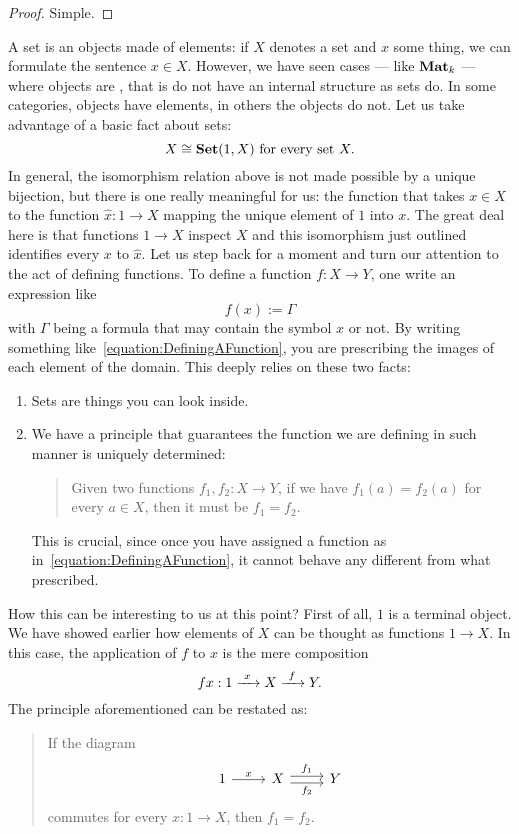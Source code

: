 \begin{proof}
Simple.
\end{proof}

\begin{example}
A set is an objects made of elements: if \(X\) denotes a set and \(x\) some thing, we can formulate the sentence \(x \in X\). However, we have seen cases --- like \(\mathbf{Mat}_k\) --- where objects are , that is do not have an internal structure as sets do. In some categories, objects have elements, in others the objects do not.\newline
Let us take advantage of a basic fact about sets:
\[X \cong \mathbf{Set}(1, X) \text{ for every set } X .\]
In general, the isomorphism relation above is not made possible by a unique bijection, but there is one really meaningful for us: the function that takes \(x \in X\) to the function \(\hat x : 1 \to X\) mapping the unique element of \(1\) into \(x\). The great deal here is that functions \(1 \to X\) inspect \(X\) and this isomorphism just outlined identifies every \(x\) to \(\hat x\).\newline
Let us step back for a moment and turn our attention to the act of defining functions. To define a function \(f : X \to Y\), one write an expression like
\begin{equation}
f(x) := \Gamma \label{equation:DefiningAFunction}
\end{equation}
with \(\Gamma\) being a formula that may contain the symbol \(x\) or not. By writing something like~\eqref{equation:DefiningAFunction}, you are prescribing the images of each element of the domain. This deeply relies on these two facts:
\begin{enumerate}
\item Sets are things you can look inside.
\item We have a principle that guarantees the function we are defining in such manner is uniquely determined:
\begin{quotation}
Given two functions \(f_1, f_2 : X \to Y\), if we have \(f_1(a) = f_2(a)\) for every \(a \in X\), then it must be \(f_1 = f_2\).
\end{quotation}
This is crucial, since once you have assigned a function as in~\eqref{equation:DefiningAFunction}, it cannot behave any different from what prescribed.
\end{enumerate}
How this can be interesting to us at this point? First of all, \(1\) is a terminal object. We have showed earlier how elements of \(X\) can be thought as functions \(1 \to X\). In this case, the application of \(f\) to \(x\) is the mere composition
\[f x : 1 \xrightarrow{\ x\ } X \xrightarrow{\ f\ } Y .\]
The principle aforementioned can be restated as:
\begin{quotation}
If the diagram
\[\begin{tikzcd}
1 \ar["x", r] & X \ar["{f_1}", r, shift left] \ar["{f_2}", r, shift right, swap] & Y
\end{tikzcd}\]
commutes for every \(x : 1 \to X\), then \(f_1 = f_2\).
\end{quotation}
\end{example}

